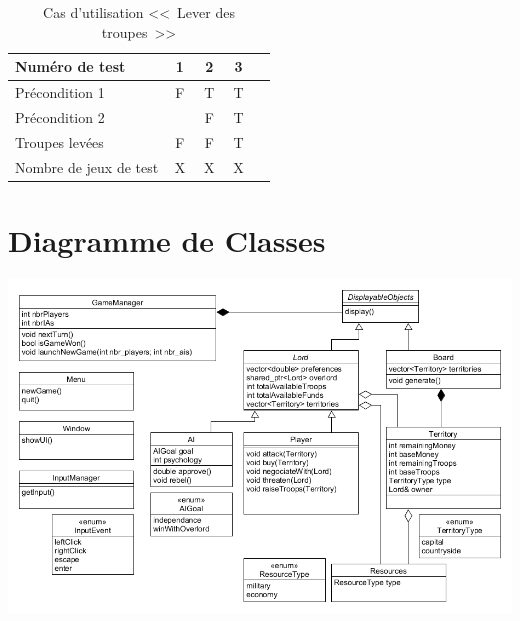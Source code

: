 \documentclass[12pt,a4paper]{article}
\begin{document}
\begin{table}[htbp!]
\begin{tabular}{|p{0.6\linewidth}|c|c|c|c|}
\hline 
Numéro de test
&1&2&3\\ 
\hline 
\hline
Précondition 1
&F&T&T\\ 
\hline
Précondition 2
& &F&T\\
\hline
\hline
Troupes levées
&F&F&T\\
\hline
\hline
Nombre de jeux de test
&X&X&X\\
\hline 
\end{tabular} 
\caption{Cas d'utilisation <<~Lever des troupes~>>}
\end{table}

\newpage

\section{Diagramme de Classes}

\includegraphics[scale=0.5]{Diagramme_Classes/diagramme_classes.png} 
\end{document}
